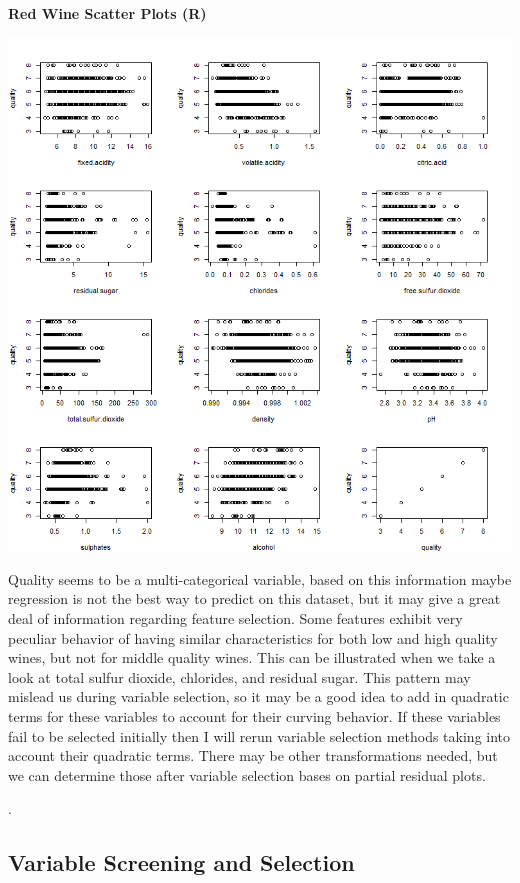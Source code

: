 \documentclass{article}
\begin{document}
	
	\newpage 
	
	\textbf{Red Wine Scatter Plots (R)}
	
	\includegraphics[scale=0.7]{../plots/Wine/red_wine_Rscatter.png}
	\newline
	
	Quality seems to be a multi-categorical variable, based on this information maybe regression is not the best
	way to predict on this dataset, but it may give a great deal of information regarding feature selection. Some
	features exhibit very peculiar behavior of having similar characteristics for both low and high quality wines, but
	not for middle quality wines. This can be illustrated when we take a look at total sulfur dioxide, chlorides, and 
	residual sugar. This pattern may mislead us during variable selection, so it may be a good idea to add in 
	quadratic terms for these variables to account for their curving behavior. If these variables fail to be selected 
	initially then I will rerun variable selection methods taking into account their quadratic terms. There may 
	be other transformations needed, but we can determine those after variable selection bases on partial residual 
	plots. 
	
	\newpage
	. 

	\subsection{Variable Screening and Selection}
	
\end{document}
